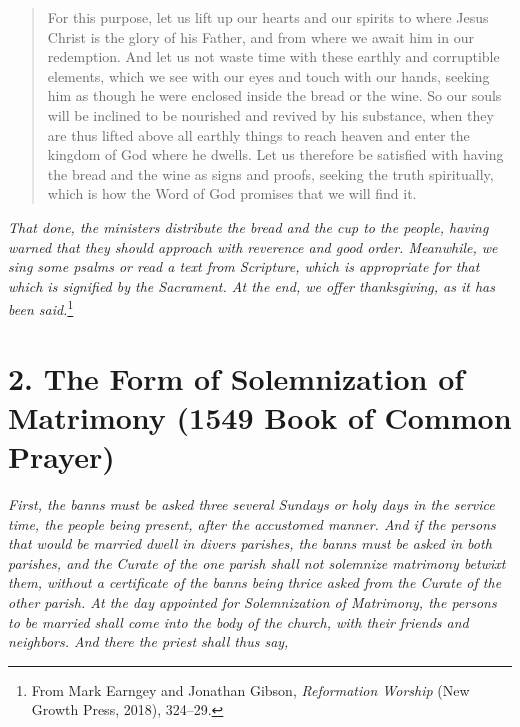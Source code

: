\documentclass[
]{book}
\begin{document}
\begin{quote}
For this purpose, let us lift up our hearts and our spirits to where Jesus Christ is the glory of his Father, and from where we await him in our redemption. And let us not waste time with these earthly and corruptible elements, which we see with our eyes and touch with our hands, seeking him as though he were enclosed inside the bread or the wine. So our souls will be inclined to be nourished and revived by his substance, when they are thus lifted above all earthly things to reach heaven and enter the kingdom of God where he dwells. Let us therefore be satisfied with having the bread and the wine as signs and proofs, seeking the truth spiritually, which is how the Word of God promises that we will find it.
\end{quote}

\emph{That done, the ministers distribute the bread and the cup to the people, having warned that they should approach with reverence and good order. Meanwhile, we sing some psalms or read a text from Scripture, which is appropriate for that which is signified by the Sacrament. At the end, we offer thanksgiving, as it has been said.}\footnote{From Mark Earngey and Jonathan Gibson, \emph{Reformation Worship} (New Growth Press, 2018), 324--29.}

\hypertarget{the-form-of-solemnization-of-matrimony-1549-book-of-common-prayer}{%
\section*{2. The Form of Solemnization of Matrimony (1549 Book of Common Prayer)}\label{the-form-of-solemnization-of-matrimony-1549-book-of-common-prayer}}

\protect\hypertarget{chapter-slug-2-the-form-of-solemnization-of-matrimony-1549-book-of-common-prayer}{\href{}{}}

\protect\hypertarget{appendix2.2}{\href{}{}}\emph{First, the banns must be asked three several Sundays or holy days in the service time, the people being present, after the accustomed manner. And if the persons that would be married dwell in divers parishes, the banns must be asked in both parishes, and the Curate of the one parish shall not solemnize matrimony betwixt them, without a certificate of the banns being thrice asked from the Curate of the other parish. At the day appointed for Solemnization of Matrimony, the persons to be married shall come into the body of the church, with their friends and neighbors. And there the priest shall thus say,}
\end{document}
